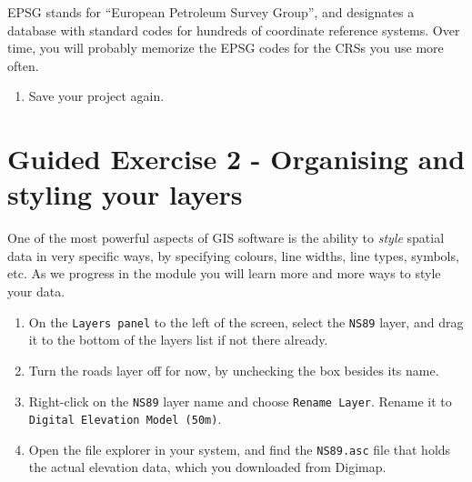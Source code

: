 \documentclass[
  letterpaper,
  DIV=11,
  numbers=noendperiod]{scrreprt}
\providecommand{\tightlist}{%
  \setlength{\itemsep}{0pt}\setlength{\parskip}{0pt}}\usepackage{longtable,booktabs,array}
\begin{document}
\begin{tcolorbox}[enhanced jigsaw, breakable, toptitle=1mm, colback=white, left=2mm, leftrule=.75mm, titlerule=0mm, colframe=quarto-callout-note-color-frame, opacityback=0, title=\textcolor{quarto-callout-note-color}{\faInfo}\hspace{0.5em}{Note}, toprule=.15mm, opacitybacktitle=0.6, bottomtitle=1mm, colbacktitle=quarto-callout-note-color!10!white, bottomrule=.15mm, coltitle=black, rightrule=.15mm, arc=.35mm]

EPSG stands for ``European Petroleum Survey Group'', and designates a
database with standard codes for hundreds of coordinate reference
systems. Over time, you will probably memorize the EPSG codes for the
CRSs you use more often.

\end{tcolorbox}

\begin{enumerate}
\def\labelenumi{(\arabic{enumi})}
\setcounter{enumi}{15}
\tightlist
\item
  Save your project again.
\end{enumerate}

\section{Guided Exercise 2 - Organising and styling your
layers}\label{guided-exercise-2---organising-and-styling-your-layers}

One of the most powerful aspects of GIS software is the ability to
\emph{style} spatial data in very specific ways, by specifying colours,
line widths, line types, symbols, etc. As we progress in the module you
will learn more and more ways to style your data.

\begin{enumerate}
\def\labelenumi{(\arabic{enumi})}
\setcounter{enumi}{16}
\item
  On the \texttt{Layers\ panel} to the left of the screen, select the
  \texttt{NS89} layer, and drag it to the bottom of the layers list if
  not there already.
\item
  Turn the roads layer off for now, by unchecking the box besides its
  name.
\item
  Right-click on the \texttt{NS89} layer name and choose
  \texttt{Rename\ Layer}. Rename it to
  \texttt{Digital\ Elevation\ Model\ (50m)}.
\item
  Open the file explorer in your system, and find the \texttt{NS89.asc}
  file that holds the actual elevation data, which you downloaded from
  Digimap.
\end{enumerate}
\end{document}
